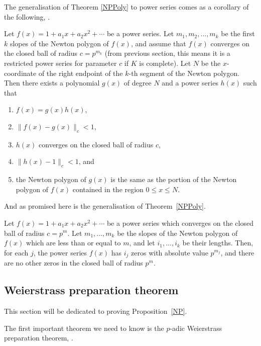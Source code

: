 The generalisation of Theorem \ref{NPPoly} to power series comes as a corollary of the following,
\cite[Proposition~7.4.10]{Gouvea}.

\begin{prop}\label{NP}
    Let $f(x) = 1 + a_1 x + a_2 x^2 + \cdots$ be a power series. Let $m_1,m_2, \dots,m_k$ be the
    first $k$ slopes of the Newton polygon of $f(x)$, and assume that $f(x)$ converges on the
    closed ball of radius $c = p^{m_k}$ (from previous section, this means it is a restricted power
    series for parameter $c$ if $K$ is complete). Let $N$ be the $x$-coordinate of the right
    endpoint of the $k$-th segment of the Newton polygon. Then there exists a polynomial
    $g(x)$ of degree $N$ and a power series $h(x)$ such that
    \begin{enumerate}
        \item $f(x) = g(x) h(x)$,
        \item $\| f(x) - g(x) \|_c < 1$,
        \item $h(x)$ converges on the closed ball of radius $c$,
        \item $\| h(x) - 1\|_c <1$, and
        \item the Newton polygon of $g(x)$ is the same as the portion of the Newton polygon of
        $f(x)$ contained in the region $0 \leq x \leq N$.
    \end{enumerate}
\end{prop}

And as promised here is the generalisation of Theorem~\ref{NPPoly}.

\begin{cor}
    Let $f(x) = 1 + a_1 x + a_2 x^2 + \cdots$ be a power series which converges on the closed ball
    of radius $c = p^m$. Let $m_1,\dots, m_k$ be the slopes of the Newton polygon of $f(x)$ which
    are less than or equal to $m$, and let $i_1,\dots,i_k$ be their lengths. Then, for each $j$, the
    power series $f(x)$ has $i_j$ zeros with absolute value $p^{m_j}$, and there are no other zeros
    in the closed ball of radius $p^m.$
\end{cor}

\subsection{Weierstrass preparation theorem}

This section will be dedicated to proving Proposition~\ref{NP}.

The first important theorem we need to know is the $p$-adic Weierstrass preparation theorem,
\cite[Theorem~7.2.10]{Gouvea}.

